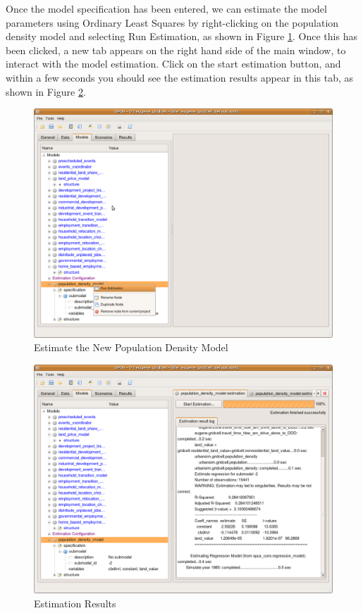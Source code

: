 Once the model specification has been entered, we can estimate the model parameters using Ordinary Least Squares by right-clicking on the population density model and selecting Run Estimation, as shown in Figure \ref{fig:specify-regression-3}. Once this has been clicked, a new tab appears on the right hand side of the main window, to interact with the model estimation.  Click on the start estimation button, and within a few seconds you should see the estimation results appear in this tab, as shown in Figure \ref{fig:specify-regression-4}.

\begin{figure}[htp]
\begin{center}
\includegraphics[scale=0.4]{part-gui/images/model-manager-specify-regression-model-3.png}
\end{center}
\caption{Estimate the New Population Density Model}
\label{fig:specify-regression-3}
\end{figure}

\begin{figure}[htp]
\begin{center}
\includegraphics[scale=0.4]{part-gui/images/model-manager-specify-regression-model-4.png}
\end{center}
\caption{Estimation Results}
\label{fig:specify-regression-4}
\end{figure}

